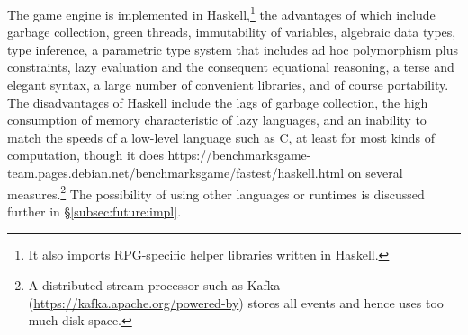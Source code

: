 The game engine is implemented in Haskell,\footnote{It also imports
RPG-specific helper libraries written in Haskell.} the advantages of
which include garbage collection, green threads, immutability of
variables, algebraic data types, type inference, a parametric type
system that includes ad hoc polymorphism plus constraints, lazy
evaluation and the consequent equational reasoning, a terse and
elegant syntax, a large number of convenient libraries, and of
course portability. The disadvantages of Haskell include the lags of
garbage collection, the high consumption of memory
characteristic of lazy languages, and an inability to match the speeds
of a low-level language such as C, at least for most kinds of
computation, though it does
{https://benchmarksgame-team.pages.debian.net/benchmarksgame/fastest/haskell.html}
on several measures.\footnote{A distributed stream processor such
as Kafka (\url{https://kafka.apache.org/powered-by})
stores all events and hence uses too much disk space.}
The possibility of using other languages or runtimes 
is discussed further in \S\ref{subsec:future:impl}.


